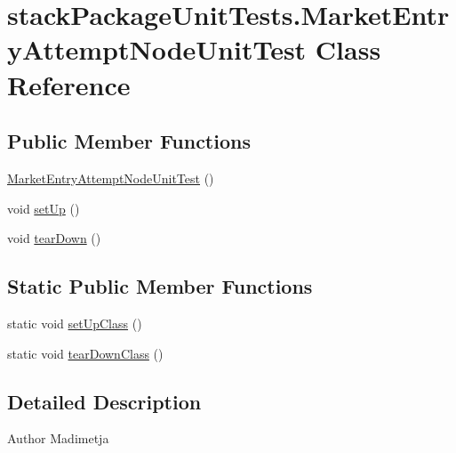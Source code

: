 \hypertarget{classstack_package_unit_tests_1_1_market_entry_attempt_node_unit_test}{\section{stack\+Package\+Unit\+Tests.\+Market\+Entry\+Attempt\+Node\+Unit\+Test Class Reference}
\label{classstack_package_unit_tests_1_1_market_entry_attempt_node_unit_test}
}
\subsection*{Public Member Functions}
\begin{DoxyCompactItemize}
\item 
\hyperlink{classstack_package_unit_tests_1_1_market_entry_attempt_node_unit_test_a89d17da03de1228fdbe1288b2e9c938f}{Market\+Entry\+Attempt\+Node\+Unit\+Test} ()
\item 
void \hyperlink{classstack_package_unit_tests_1_1_market_entry_attempt_node_unit_test_a9390c1c0e025bf0b4e52d90e823b178e}{set\+Up} ()
\item 
void \hyperlink{classstack_package_unit_tests_1_1_market_entry_attempt_node_unit_test_ac53239c7d35e9cf1105772b0830bf111}{tear\+Down} ()
\end{DoxyCompactItemize}
\subsection*{Static Public Member Functions}
\begin{DoxyCompactItemize}
\item 
static void \hyperlink{classstack_package_unit_tests_1_1_market_entry_attempt_node_unit_test_a4ca18c744d6e0e6ae6c71d18dc292e13}{set\+Up\+Class} ()
\item 
static void \hyperlink{classstack_package_unit_tests_1_1_market_entry_attempt_node_unit_test_af36feb95c6dbe4c59ce7f2014d7ba4ae}{tear\+Down\+Class} ()
\end{DoxyCompactItemize}


\subsection{Detailed Description}
\begin{DoxyAuthor}{Author}
Madimetja 
\end{DoxyAuthor}


